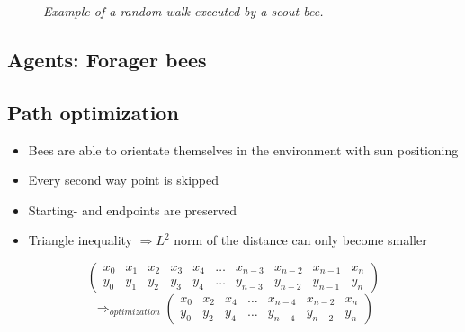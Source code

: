 \documentclass[
	paper=128mm:96mm,
	fontsize=11pt,
	pagesize,
	parskip=half-,
]{scrartcl}
\theoremstyle{mythmstyle} %
\begin{document}
		\begin{figure}[H]
			\centering
			\caption{\textit{Example of a random walk executed by a scout bee.}}
		\end{figure}
	\clearpage


\subsection{Agents: Forager bees}
	
	\clearpage


\subsection{Path optimization}
	\begin{itemize}
		\item Bees are able to orientate themselves in the environment with sun positioning \cite{seeley95}
		\item Every second way point is skipped
		\item Starting- and endpoints are preserved
		\item Triangle inequality $\Rightarrow L^2$ norm of the distance can only become smaller
	\end{itemize}
	\[
		\begin{pmatrix}
			x_0 & x_1 & x_2 & x_3 & x_4 & \ldots & x_{n-3} & x_{n-2} & x_{n-1} & x_n \\
			y_0 & y_1 & y_2 & y_3 & y_4 & \ldots & y_{n-3} & y_{n-2} & y_{n-1} & y_n
		\end{pmatrix}
	\]
	\[
		\Longrightarrow_{optimization}
		\begin{pmatrix}
			x_0 & x_2 & x_4 & \ldots & x_{n-4} & x_{n-2} & x_{n} \\ y_0 & y_2 & y_4 & \ldots & y_{n-4} & y_{n-2} & y_{n}
		\end{pmatrix}
	\]
	\clearpage
\end{document}
